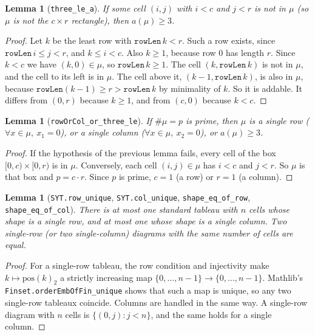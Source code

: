 \documentclass[11pt]{article}
\newtheorem{lemma}[theorem]{Lemma}
\theoremstyle{definition}
\begin{document}
\begin{lemma}[\texttt{three\_le\_a}]
If some cell $(i,j)$ with $i<c$ and $j<r$ is not in $\mu$ (so $\mu$ is not the $c\times r$ rectangle),
then $a(\mu)\ge3$.
\end{lemma}
\begin{proof}
Let $k$ be the least row with $\mathtt{rowLen}\,k<r$. Such a row exists, since $\mathtt{rowLen}\,i\le j<r$, and
$k\le i<c$. Also $k\ge 1$, because row $0$ has length $r$. Since $k<c$ we have $(k,0)\in\mu$, so
$\mathtt{rowLen}\,k\ge1$. The cell $(k,\mathtt{rowLen}\,k)$ is not in $\mu$, and the cell to its left is in
$\mu$. The cell above it, $(k-1,\mathtt{rowLen}\,k)$, is also in $\mu$, because $\mathtt{rowLen}(k-1)\ge r>\mathtt{rowLen}\,k$
by minimality of $k$. So it is addable. It differs from $(0,r)$ because $k\ge1$, and from $(c,0)$
because $k<c$.
\end{proof}

\begin{lemma}[\texttt{rowOrCol\_or\_three\_le}]
If $\#\mu=p$ is prime, then $\mu$ is a single row ($\forall x\in\mu,\ x_1=0$), or a single column
($\forall x\in\mu,\ x_2=0$), or $a(\mu)\ge3$.
\end{lemma}
\begin{proof}
If the hypothesis of the previous lemma fails, every cell of the box $[0,c)\times[0,r)$ is in $\mu$.
Conversely, each cell $(i,j)\in\mu$ has $i<c$ and $j<r$. So $\mu$ is that box and $p=c\cdot r$. Since $p$
is prime, $c=1$ (a row) or $r=1$ (a column).
\end{proof}

\begin{lemma}[\texttt{SYT.row\_unique}, \texttt{SYT.col\_unique}, \texttt{shape\_eq\_of\_row}, \texttt{shape\_eq\_of\_col}]
There is at most one standard tableau with $n$ cells whose shape is a single row, and at most one
whose shape is a single column. Two single-row (or two single-column) diagrams with the same number
of cells are equal.
\end{lemma}
\begin{proof}
For a single-row tableau, the row condition and injectivity make $k\mapsto \mathrm{pos}(k)_2$ a strictly
increasing map $\{0,\dots,n-1\}\to\{0,\dots,n-1\}$. Mathlib's \texttt{Finset.orderEmbOfFin\_unique} shows
that such a map is unique, so any two single-row tableaux coincide. Columns are handled in the same
way. A single-row diagram with $n$ cells is $\{(0,j):j<n\}$, and the same holds for a single column.
\end{proof}
\end{document}
